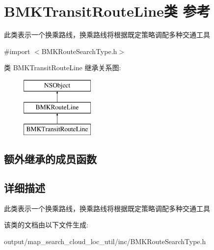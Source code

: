 \hypertarget{interface_b_m_k_transit_route_line}{\section{B\+M\+K\+Transit\+Route\+Line类 参考}
\label{interface_b_m_k_transit_route_line}
}


此类表示一个换乘路线，换乘路线将根据既定策略调配多种交通工具  




{\ttfamily \#import $<$B\+M\+K\+Route\+Search\+Type.\+h$>$}

类 B\+M\+K\+Transit\+Route\+Line 继承关系图\+:\begin{figure}[H]
\begin{center}
\leavevmode
\includegraphics[height=3.000000cm]{interface_b_m_k_transit_route_line}
\end{center}
\end{figure}
\subsection*{额外继承的成员函数}


\subsection{详细描述}
此类表示一个换乘路线，换乘路线将根据既定策略调配多种交通工具 

该类的文档由以下文件生成\+:\begin{DoxyCompactItemize}
\item 
output/map\+\_\+search\+\_\+cloud\+\_\+loc\+\_\+util/inc/B\+M\+K\+Route\+Search\+Type.\+h\end{DoxyCompactItemize}
